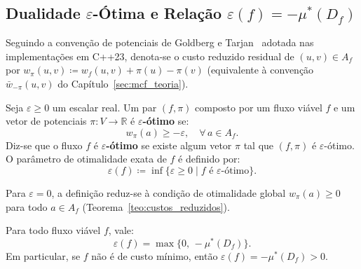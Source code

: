 \subsection{Dualidade $\varepsilon$-Ótima e Relação $\varepsilon(f) = -\mu^*(D_f)$}

Seguindo a convenção de potenciais de Goldberg e Tarjan~\cite{goldberg1989finding} adotada nas implementações em C++23, denota-se o custo reduzido residual de $(u,v) \in A_f$ por $w_\pi(u,v) \coloneqq w_f(u,v) + \pi(u) - \pi(v)$ (equivalente à convenção $\bar{w}_{-\pi}(u,v)$ do Capítulo~\ref{sec:mcf_teoria}).

\begin{definicao}
Seja $\varepsilon \ge 0$ um escalar real. Um par $(f, \pi)$ composto por um fluxo viável $f$ e um vetor de potenciais $\pi: V \to \mathbb{R}$ é \textbf{$\varepsilon$-ótimo} se:
\begin{equation}
    w_\pi(a) \ge -\varepsilon, \quad \forall\, a \in A_f.
\end{equation}
Diz-se que o fluxo $f$ é \textbf{$\varepsilon$-ótimo} se existe algum vetor $\pi$ tal que $(f, \pi)$ é $\varepsilon$-ótimo. O parâmetro de otimalidade exata de $f$ é definido por:
\begin{equation}
    \varepsilon(f) \coloneqq \inf\bigl\{ \varepsilon \ge 0 \mid f \text{ é } \varepsilon\text{-ótimo} \bigr\}.
\end{equation}
\end{definicao}

Para $\varepsilon = 0$, a definição reduz-se à condição de otimalidade global $w_\pi(a) \ge 0$ para todo $a \in A_f$ (Teorema~\ref{teo:custos_reduzidos}).

\begin{teorema}
Para todo fluxo viável $f$, vale:
\begin{equation}
    \varepsilon(f) = \max\bigl\{0,\, -\mu^*(D_f)\bigr\}.
\end{equation}
Em particular, se $f$ não é de custo mínimo, então $\varepsilon(f) = -\mu^*(D_f) > 0$.
\end{teorema}

